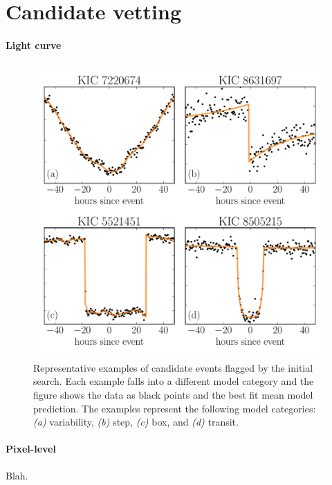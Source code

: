 \documentclass[preprint]{aastex}
\newcommand{\figlabel}[1]{\label{fig:#1}}
\begin{document}
\section{Candidate vetting}

\paragraph{Light curve}


\begin{figure}[p]
\begin{center}
\includegraphics[width=\textwidth]{figures/model_comp.pdf}
\end{center}
\caption{%
Representative examples of candidate events flagged by the initial search.
Each example falls into a different model category and the figure shows the
data as black points and the best fit mean model prediction.
The examples represent the following model categories:
\emph{(a)} variability, \emph{(b)} step, \emph{(c)} box, and \emph{(d)}
transit.
\figlabel{model-comp}}
\end{figure}

\paragraph{Pixel-level}

Blah.
\end{document}
